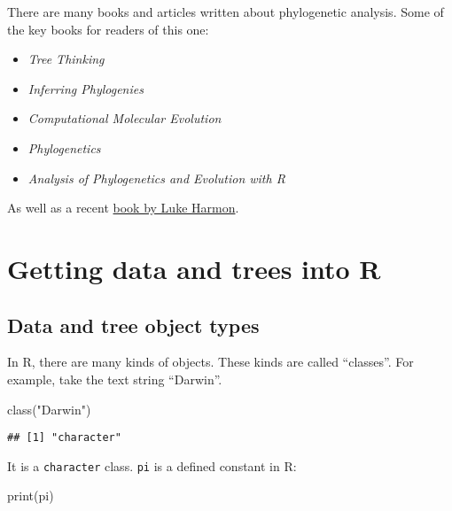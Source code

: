 \documentclass[
]{article}
\newenvironment{Shaded}{\begin{snugshade}}{\end{snugshade}}
\newcommand{\FunctionTok}[1]{\textcolor[rgb]{0.00,0.00,0.00}{#1}}
\newcommand{\NormalTok}[1]{#1}
\newcommand{\StringTok}[1]{\textcolor[rgb]{0.31,0.60,0.02}{#1}}
\providecommand{\tightlist}{%
  \setlength{\itemsep}{0pt}\setlength{\parskip}{0pt}}
\begin{document}
There are many books and articles written about phylogenetic analysis. Some of the key books for readers of this one:

\begin{itemize}
\tightlist
\item
  \emph{Tree Thinking} \citep{BaumTreethinkingintroduction2013}
\item
  \emph{Inferring Phylogenies} \citep{felsenstein_inferring_2004}
\item
  \emph{Computational Molecular Evolution} \citep{YangComputationalmolecularevolution2006}
\item
  \emph{Phylogenetics} \citep{SemplePhylogenetics2003}
\item
  \emph{Analysis of Phylogenetics and Evolution with R} \citep{ParadisAnalysisPhylogeneticsEvolution2011}
\end{itemize}

As well as a recent \href{https://lukejharmon.github.io/pcm/chapters/}{book by Luke Harmon}.

\hypertarget{getting-data-and-trees-into-r}{%
\section{Getting data and trees into R}\label{getting-data-and-trees-into-r}}

\hypertarget{data-and-tree-object-types}{%
\subsection{Data and tree object types}\label{data-and-tree-object-types}}

In R, there are many kinds of objects. These kinds are called ``classes''. For example, take the text string ``Darwin''.

\begin{Shaded}
\begin{Highlighting}[]
\FunctionTok{class}\NormalTok{(}\StringTok{"Darwin"}\NormalTok{)}
\end{Highlighting}
\end{Shaded}

\begin{verbatim}
## [1] "character"
\end{verbatim}

It is a \texttt{character} class. \texttt{pi} is a defined constant in R:

\begin{Shaded}
\begin{Highlighting}[]
\FunctionTok{print}\NormalTok{(pi)}
\end{Highlighting}
\end{Shaded}
\end{document}
